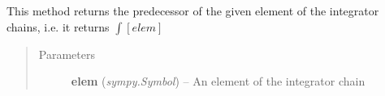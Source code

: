\documentclass[letterpaper,10pt,english]{sphinxmanual}
\begin{document}
\begin{fulllineitems}
\begin{fulllineitems}
\begin{quote}
\begin{description}
\end{description}\end{quote}

\end{fulllineitems}


\begin{fulllineitems}
\label{pytrajectory:pytrajectory.utilities.IntegChain.pred}
This method returns the predecessor of the given element of the
integrator chains, i.e. it returns \(\int [elem]\)
\begin{quote}\begin{description}
\item[{Parameters}] \leavevmode
\textbf{elem} (\emph{sympy.Symbol}) -- An element of the integrator chain

\end{description}\end{quote}

\end{fulllineitems}


\end{fulllineitems}

\end{document}
